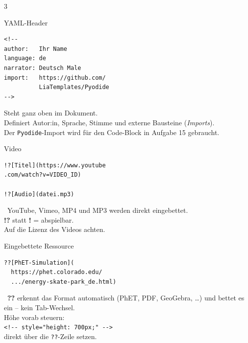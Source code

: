 \documentclass[a4paper,landscape,9pt]{extarticle}
\newcommand{\prevsm}[1]{{\footnotesize\color{muted} #1}}
\begin{document}
\begin{multicols}{3}


\begin{liacard}{YAML-Header}
\begin{lstlisting}[language=lia]
<!--
author:   Ihr Name
language: de
narrator: Deutsch Male
import:   https://github.com/
          LiaTemplates/Pyodide
-->
\end{lstlisting}
\tcblower
\prevsm{Steht ganz oben im Dokument.\\
Definiert Autor:in, Sprache, Stimme
und externe Bausteine (\textit{Imports}).\\[2pt]
{\footnotesize Der \texttt{Pyodide}-Import wird für den
Code-Block in Aufgabe 15 gebraucht.}}
\end{liacard}


\begin{liacard}{Video}
\begin{lstlisting}[language=lia]
!?[Titel](https://www.youtube
.com/watch?v=VIDEO_ID)

!?[Audio](datei.mp3)
\end{lstlisting}
\tcblower
\prevsm{\faYoutube~YouTube, Vimeo, MP4
und MP3 werden direkt eingebettet.\\[2pt]
\textbf{!?} statt \textbf{!} = abspielbar.\\[2pt]
{\footnotesize Auf die Lizenz des Videos achten.}}
\end{liacard}

\begin{liacard}{Eingebettete Ressource}
\begin{lstlisting}[language=lia]
??[PhET-Simulation](
  https://phet.colorado.edu/
  .../energy-skate-park_de.html)
\end{lstlisting}
\tcblower
\prevsm{\faWindowMaximize~\textbf{??} erkennt das Format
automatisch (PhET, PDF, GeoGebra, \dots)
und bettet es ein -- kein Tab-Wechsel.\\[2pt]
{\footnotesize Höhe vorab steuern:\\
\texttt{<!-{}- style="height: 700px;" -{}->}\\
direkt über die \texttt{??}-Zeile setzen.}}
\end{liacard}


\end{multicols}
\end{document}

